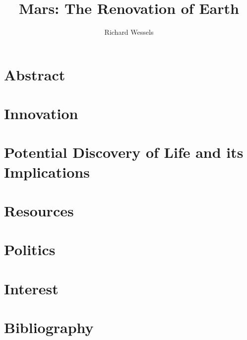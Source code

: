 \documentclass[12pt]{report}
\begin{document}
\title{\Huge Mars: The Renovation of Earth}
\author{Richard Wessels}
\date{}
\maketitle

\tableofcontents
\newpage
{}

\section{Abstract}


\newpage

\section{Innovation}


\newpage

\section{Potential Discovery of Life and its Implications}


\newpage

\section{Resources}


\newpage

\section{Politics}


\newpage

\section{Interest}


\newpage

\section{Bibliography}

\end{document}
